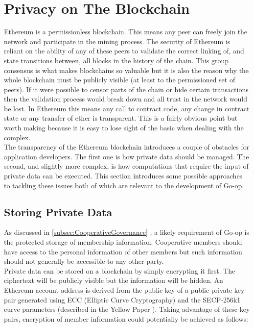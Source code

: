 \section{Privacy on The Blockchain}
\label{sec:blockchainprivacy}
Ethereum is a permissionless blockchain. This means any peer can freely join the network and participate in the mining process. The security of Ethereum is reliant on the ability of any of these peers to validate the correct linking of, and state transitions between, all blocks in the history of the chain. This group consensus is what makes blockchains so valuable but it is also the reason why the whole blockchain must be publicly visible (at least to the permissioned set of peers). If it were possible to censor parts of the chain or hide certain transactions then the validation process would break down and all trust in the network would be lost. In Ethereum this means any call to contract code, any change in contract state or any transfer of ether is transparent. This is a fairly obvious point but worth making because it is easy to lose sight of the basic when dealing with the complex.\\

The transparency of the Ethereum blockchain introduces a couple of obstacles for application developers. The first one is how private data should be managed. The second, and slightly more complex, is how computations that require the input of private data can be executed. This section introduces some possible approaches to tackling these issues both of which are relevant to the development of Go-op. \\

\subsection{Storing Private Data}
As discussed in \ref{subsec:CooperativeGovernance} , a likely requirement of Go-op is the protected storage of membership information. Cooperative members should have access to the personal information of other members but such information should not generally be accessible to any other party. \\

Private data can be stored on a blockchain by simply encrypting it first. The ciphertext will be publicly visible but the information will be hidden. An Ethereum account address is derived from the public key of a public-private key pair generated using ECC (Elliptic Curve Cryptography) and the SECP-256k1 curve parameters (described in the Yellow Paper \cite{wood2014ethereum}). Taking advantage of these key pairs, encryption of member information could potentially be achieved as follows:\\

